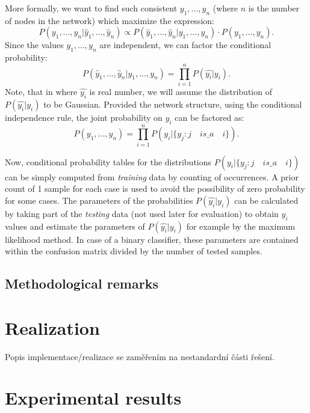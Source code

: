 \documentclass[11pt,twoside,a4paper]{book}
\begin{document}
More formally, we want to find such consistent $y_1, ..., y_n$
(where $n$ is the number of nodes in the network)
which maximize the expression:
\[P(y_1, ..., y_n | \hat{y}_1, ..., \hat{y}_n) \propto P(\hat{y}_1, ..., \hat{y}_n | y_1, ..., y_n) \cdot P(y_1, ..., y_n). \]
Since the values $y_1, ..., y_n$ are independent, we can factor the conditional probability:
\[P(\hat{y}_1, ..., \hat{y}_n | y_1, ..., y_n) = \prod_{i=1}^n P(\hat{y_i}|y_i). \]
Note, that in where $\hat{y_i}$ is real number,
we will assume the distribution of $P(\hat{y_i}|y_i)$ to be Gaussian.
Provided the network structure, using the conditional independence rule,
the joint probability on $y_i$ can be factored as:
\[ P(y_1, ..., y_n) = \prod_{i=1}^n P(y_i|\{y_j : j  \quad  is\_a \quad  i\}). \]

Now, conditional probability tables for the distributions $P(y_i|\{y_j : j  \quad  is\_a \quad  i\})$ 
can be simply computed from \emph{training} data by counting of occurrences.
A prior count of 1 sample for each case is used to avoid the 
possibility of zero probability for some cases.
The parameters of the probabilities $P(\hat{y_i}|y_i)$ can be
calculated by taking part of the \emph{testing} data
(not used later for evaluation) to
obtain $y_i$ values and estimate the parameters of $P(\hat{y_i}|y_i)$
for example by the maximum likelihood method.
In case of a binary classifier, 
these parameters are contained within the confusion matrix divided 
by the number of tested samples.

\section{Methodological remarks}
\chapter{Realization}
Popis implementace/realizace se zaměřením na nestandardní části řešení.


\chapter{Experimental results}
\end{document}
